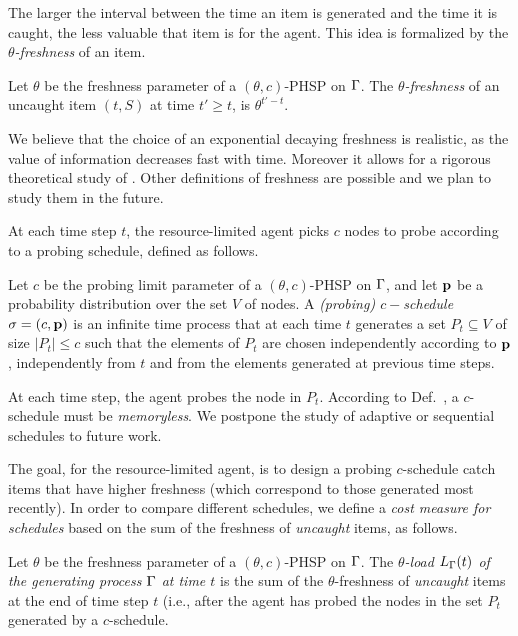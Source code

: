 The larger the interval between the time an item is generated and the time it is
caught, the less valuable that item is for the agent. This idea is formalized
by the \emph{$\theta$-freshness} of an item.

\begin{definition}
	Let $\theta$ be the freshness parameter of a $(\theta,c)$-PHSP on $\Gamma$.
	The \emph{$\theta$-freshness} of an uncaught item $(t,S)$ at time $t'\ge t$,
	is $\theta^{t'-t}$.
\end{definition}
We believe that the choice of an exponential decaying freshness is realistic, as
the value of information decreases fast with time. Moreover it allows for a
rigorous theoretical study of \probname. Other definitions of freshness are
possible and we plan to study them in the future.

At each time step $t$, the resource-limited agent picks $c$ nodes to probe
according to a probing schedule, defined as follows.

\begin{definition}[$c$-Schedule]\label{def:schedule}
	Let $c$ be the probing limit parameter of a $(\theta,c)$-PHSP on $\Gamma$, and
	let $\mathbf{p}$ be a probability distribution over the set $V$ of nodes. A
	\emph{(probing) $c-$schedule} $\sigma=(c,\mathbf{p})$ is an infinite time process
	that at each time $t$ generates a set $P_t\subseteq V$ of size $|P_t|\le c$
	such that the elements of $P_t$ are chosen independently according to $\mathbf{p}$,
	independently from $t$ and from the elements generated at previous time
	steps.
\end{definition}
At each time step, the agent probes the node in $P_t$. According to
Def.~\label{def:schedule}, a $c$-schedule must be \emph{memoryless}. We postpone
the study of adaptive or sequential schedules to future work.

The goal, for the resource-limited agent, is to design a probing $c$-schedule
catch items that have higher freshness (which correspond to those generated
most recently). In order to compare different schedules, we define a \emph{cost
measure for schedules} based on the sum of the freshness of \emph{uncaught}
items, as follows.

Let $\theta$ be the freshness parameter of a $(\theta,c)$-PHSP on $\Gamma$. The
\emph{$\theta$-load $L_\Gamma(t)$ of the generating process $\Gamma$ at time $t$} is
the sum of the $\theta$-freshness of \emph{uncaught} items at the end of time
step $t$ (i.e., after the agent has probed the nodes in the set $P_t$ generated
by a $c$-schedule.

